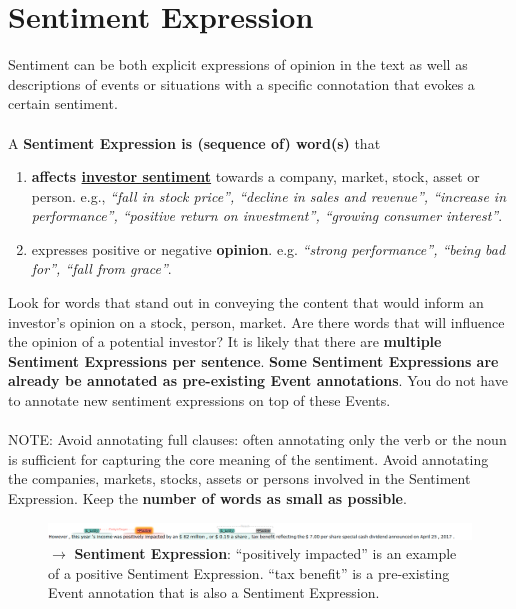 
\section{Sentiment Expression}
\label{sec:sentimentexpressiondefinition}
Sentiment can be both explicit expressions of opinion in the text as well as descriptions of events or situations with a specific connotation that evokes a certain sentiment.
\\\\
\noindent
A \textbf{Sentiment Expression is (sequence of) word(s)} that
\begin{enumerate}[label=\alph*), leftmargin=*]
    \item \textbf{affects \hyperref[sec:sentimentdef]{investor sentiment}} towards a company, market, stock, asset or person. e.g., \textit{``fall in stock price'', ``decline in sales and revenue'', ``increase in performance'', ``positive return on investment'', ``growing consumer interest''}.
    \item expresses positive or negative \textbf{opinion}. e.g. \textit{``strong performance'', ``being bad for'', ``fall from grace''}.
\end{enumerate}
\noindent
Look for words that stand out in conveying the content that would inform an investor’s opinion on a stock, person, market. Are there words that will influence the opinion of a potential investor?
It is likely that there are \textbf{multiple Sentiment Expressions per sentence}.
\textbf{Some Sentiment Expressions are already be annotated as pre-existing Event annotations}.
You do not have to annotate new sentiment expressions on top of these Events.\\\\
\noindent
\textcolor{BrickRed}{NOTE: Avoid annotating full clauses: often annotating only the verb or the noun is sufficient for capturing the core meaning of the sentiment. Avoid annotating the companies, markets, stocks, assets or persons involved in the Sentiment Expression. Keep the \textbf{number of words as small as possible}.}

\begin{figure}[h]
    \centering
    \includegraphics[width=\textwidth]{img/cost03s11 general example.png}
    \caption*{$\rightarrow$ \textbf{Sentiment Expression}: ``positively impacted'' is an example of a positive Sentiment Expression. ``tax benefit'' is a pre-existing Event annotation that is also a Sentiment Expression.}
    \label{fig:my_label}
\end{figure}


